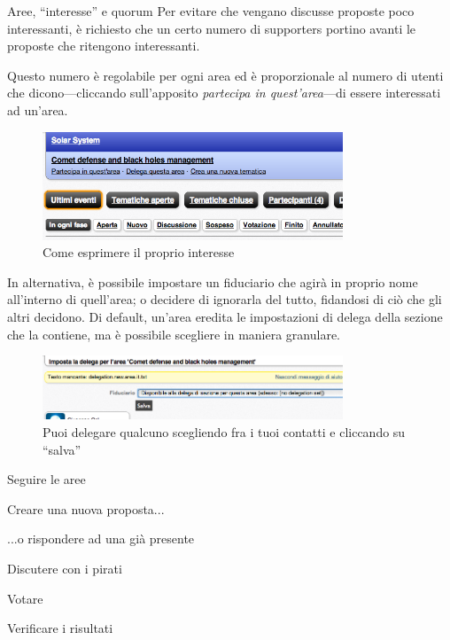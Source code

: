 \documentclass{beamer}
\begin{document}
\begin{frame}[allowframebreaks]{Aree, ``interesse'' e quorum}
Per evitare che vengano discusse proposte poco interessanti, \`e richiesto che un certo numero di supporters portino avanti le proposte che ritengono interessanti.

Questo numero \`e regolabile per ogni area ed \`e proporzionale al numero di utenti che dicono---cliccando sull'apposito \emph{partecipa in quest'area}---di essere interessati ad un'area.
\begin{figure}\includegraphics[width=0.8\textwidth]{pics/partecipa}
\caption{Come esprimere il proprio interesse}
\end{figure}
\framebreak
In alternativa, \`e possibile impostare un fiduciario che agir\`a in proprio nome all'interno di quell'area; o decidere di ignorarla del tutto, fidandosi di ci\`o che gli altri decidono. Di default, un'area eredita le impostazioni di delega della sezione che la contiene, ma \`e possibile scegliere in maniera granulare.
\begin{figure}\includegraphics[width=0.8\textwidth]{pics/delega}
\caption{Puoi delegare qualcuno scegliendo fra i tuoi contatti e cliccando su ``salva''}
\end{figure}
\end{frame}

\begin{frame}{Seguire le aree}
\end{frame}

\begin{frame}{Creare una nuova proposta... }
\end{frame}

\begin{frame}{...o rispondere ad una gi\`a presente}
\end{frame}

\begin{frame}{Discutere con i pirati}
\end{frame}

\begin{frame}{Votare}
\end{frame}

\begin{frame}{Verificare i risultati}
\end{frame}
\end{document}
